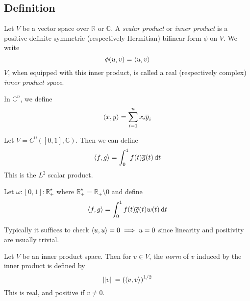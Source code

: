 \subsection{Definition}
\begin{definition}
	Let \( V \) be a vector space over \( \mathbb R \) or \( \mathbb C \).
	A \textit{scalar product} or \textit{inner product} is a positive-definite symmetric (respectively Hermitian) bilinear form \( \phi \) on \( V \).
	We write
	\[
		\phi(u,v) = \left\langle{u,v}\right\rangle
	\]
	\( V \), when equipped with this inner product, is called a real (respectively complex) \textit{inner product space}.
\end{definition}
\begin{example}
	In \( \mathbb C^n \), we define
	\[
		\left\langle{x,y}\right\rangle = \sum_{i=1}^n x_i \overline y_i
	\]
\end{example}
\begin{example}
	Let \( V = C^0([0,1], \mathbb C) \).
	Then we can define
	\[
		\left\langle{f,g}\right\rangle = \int_0^1 f(t) \overline g(t) \dd{t}
	\]
	This is the \( L^2 \) scalar product.
\end{example}
\begin{example}
	Let \( \omega \colon [0,1] \colon \mathbb R^\star_+ \) where \( \mathbb R^\star_+ = \mathbb R_+ \setminus \qty{0} \) and define
	\[
		\left\langle{f,g}\right\rangle = \int_0^1 f(t) \overline g(t) w(t) \dd{t}
	\]
\end{example}
\begin{remark}
	Typically it suffices to check \( \left\langle{u,u}\right\rangle = 0 \implies u = 0 \) since linearity and positivity are usually trivial.
\end{remark}
\begin{definition}
	Let \( V \) be an inner product space.
	Then for \( v \in V \), the \textit{norm} of \( v \) induced by the inner product is defined by
	\[
		\norm{v} = \qty(\left\langle{v,v}\right\rangle)^{1/2}
	\]
	This is real, and positive if \( v \neq 0 \).
\end{definition}

